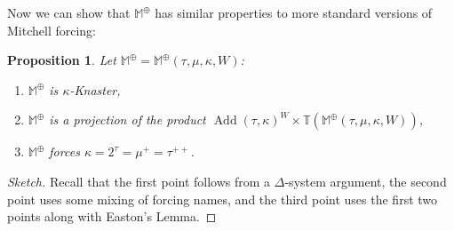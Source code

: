 \documentclass[a4paper]{amsart}
\theoremstyle{definition}
\theoremstyle{remark}
\theoremstyle{plain}
\newtheorem{mypro}[mydef]{Proposition}
\numberwithin{mydef}{section}
\DeclareMathOperator{\Add}{Add}
\newcommand{\dM}{\mathbb{M}}
\newcommand{\dT}{\mathbb{T}}
\begin{document}
	
	Now we can show that $\dM^\oplus$ has similar properties to more standard versions of Mitchell forcing:


\begin{mypro} Let $\dM^\oplus = \dM^\oplus(\tau,\mu,\kappa,W)$:

\begin{enumerate}
\item $\dM^\oplus$ is $\kappa$-Knaster,
\item $\dM^\oplus$ is a projection of the product $\Add(\tau,\kappa)^W \times \dT(\dM^\oplus(\tau,\mu,\kappa,W))$,
\item $\dM^\oplus$ forces $\kappa = 2^\tau = \mu^+ = \tau^{++}$.
\end{enumerate}\end{mypro}

\begin{proof}[Sketch] Recall that the first point follows from a $\Delta$-system argument, the second point uses some mixing of forcing names, and the third point uses the first two points along with Easton's Lemma.\end{proof}
\end{document}
